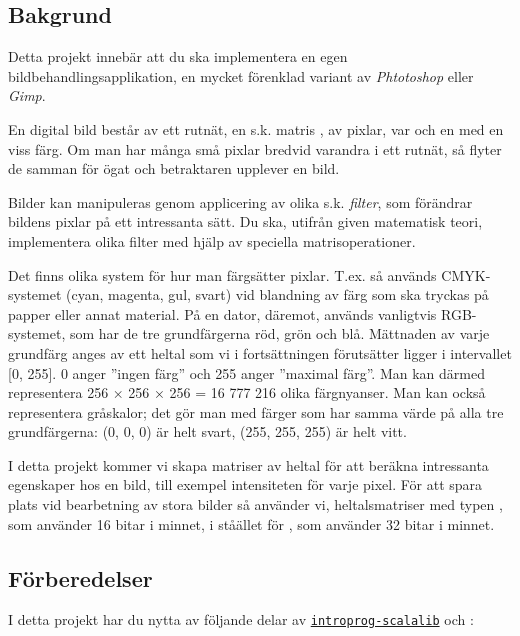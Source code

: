 

\subsection{Bakgrund}
Detta projekt innebär att du ska implementera en egen bildbehandlingsapplikation, en mycket förenklad variant av \emph{Phtotoshop} eller \emph{Gimp}. 

En digital bild består av ett rutnät, en s.k. matris , av pixlar, var och en med en viss färg. Om man har många små pixlar bredvid varandra i ett rutnät, så flyter de samman för ögat och betraktaren upplever en bild.

Bilder kan manipuleras genom applicering av olika s.k. \emph{filter}, som förändrar bildens pixlar på ett intressanta sätt. Du ska, utifrån given matematisk teori, implementera olika filter med hjälp av speciella matrisoperationer.


Det finns olika system för hur man färgsätter pixlar. T.ex. så används CMYK-systemet (cyan, magenta, gul, svart) vid blandning av färg som ska tryckas på papper eller annat material. På en dator, däremot, används vanligtvis RGB-systemet, som har de tre grundfärgerna röd, grön och blå. Mättnaden av varje grundfärg anges av ett heltal som vi i fortsättningen förutsätter ligger i intervallet [0, 255]. 0 anger ''ingen färg'' och 255 anger ''maximal färg''. Man kan därmed representera 256 × 256 × 256 = 16 777 216 olika färgnyanser. Man kan också representera gråskalor; det gör man med färger som har samma värde på alla tre 
grundfärgerna: (0, 0, 0) är helt svart, (255, 255, 255) är helt vitt. 

I detta projekt kommer vi skapa matriser av heltal för att beräkna intressanta egenskaper hos en bild, till exempel intensiteten för varje pixel. 
För att spara plats vid bearbetning av stora bilder så använder vi, heltalsmatriser med typen , som använder 16 bitar i minnet, i ståället för , som använder 32 bitar i minnet. 

\subsection{Förberedelser}

I detta projekt har du nytta av följande delar av \href{https://github.com/lunduniversity/introprog-scalalib}{\texttt{introprog-scalalib}} och :

